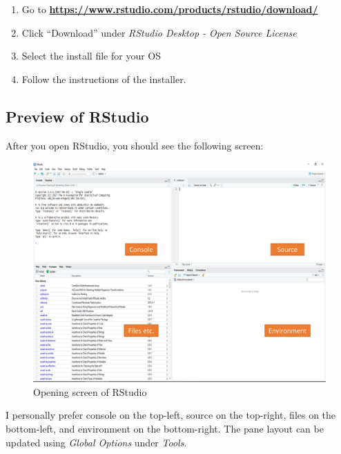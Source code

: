 \documentclass[]{book}
\providecommand{\tightlist}{%
  \setlength{\itemsep}{0pt}\setlength{\parskip}{0pt}}
\begin{document}
\begin{enumerate}
\def\labelenumi{\arabic{enumi}.}
\tightlist
\item
  Go to \href{https://www.rstudio.com/products/rstudio/download/}{\textbf{https://www.rstudio.com/products/rstudio/download/}}
\item
  Click ``Download'' under \emph{RStudio Desktop - Open Source License}
\item
  Select the install file for your OS
\item
  Follow the instructions of the installer.
\end{enumerate}

\hypertarget{preview-of-rstudio}{%
\subsection{Preview of RStudio}\label{preview-of-rstudio}}

After you open RStudio, you should see the following screen:

\begin{figure}
\centering
\includegraphics{figure/img1.png}
\caption{Opening screen of RStudio}
\end{figure}

I personally prefer console on the top-left, source on the top-right, files on the bottom-left, and environment on the bottom-right. The pane layout can be updated using \emph{Global Options} under \emph{Tools}.
\end{document}
